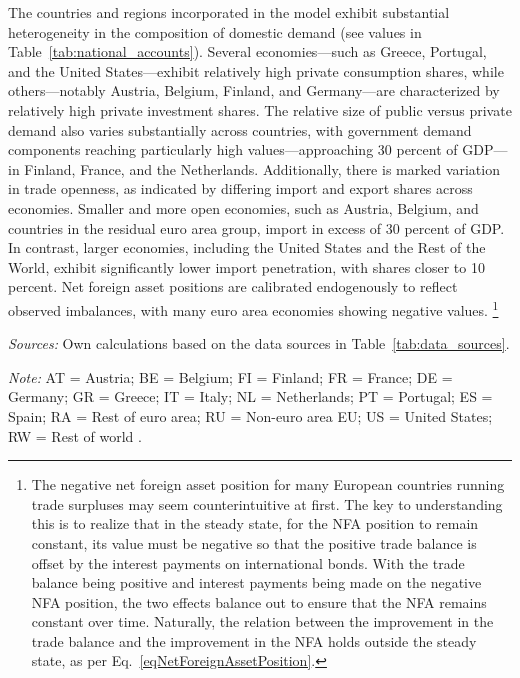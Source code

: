 \documentclass[a4paper,11pt]{article}
\newcommand{\tabnote}[2]{\vspace{2mm}\par\noindent\begin{minipage}{0.9\textwidth}\footnotesize\setlength{\parindent}{0pt}\emph{Sources: }#1\par\vspace{2mm}\emph{Note: }#2\end{minipage}}
\numberwithin{equation}{section}
\newcommand{\CountryCodes}{%
AT = Austria; BE = Belgium; FI = Finland; FR = France; DE = Germany; GR = Greece; IT = Italy; NL = Netherlands; PT = Portugal; ES = Spain; RA = Rest of euro area; RU = Non-euro area EU; US = United States; RW = Rest of world%
}
\begin{document}
The countries and regions incorporated in the model exhibit substantial heterogeneity in the composition of domestic demand (see values in Table~\ref{tab:national_accounts}).
Several economies---such as Greece, Portugal, and the United States---exhibit relatively high private consumption shares, while others---notably Austria, Belgium, Finland, and Germany---are characterized by relatively high private investment shares. The relative size of public versus private demand also varies substantially across countries, with government demand components reaching particularly high values---approaching 30 percent of GDP---in Finland, France, and the Netherlands.
Additionally, there is marked variation in trade openness, as indicated by differing import and export shares across economies.
Smaller and more open economies, such as Austria, Belgium, and countries in the residual euro area group, import in excess of 30 percent of GDP.
In contrast, larger economies, including the United States and the Rest of the World, exhibit significantly lower import penetration, with shares closer to 10 percent.
Net foreign asset positions are calibrated endogenously to reflect observed imbalances, with many euro area economies showing negative values.
\footnote{
    The negative net foreign asset position for many European countries running trade surpluses may seem counterintuitive at first. 
    The key to understanding this is to realize that in the steady state, for the NFA position to remain constant, its value must be negative so that the positive trade balance is offset by the interest payments on international bonds. 
    With the trade balance being positive and interest payments being made on the negative NFA position, the two effects balance out to ensure that the NFA remains constant over time. 
    Naturally, the relation between the improvement in the trade balance and the improvement in the NFA holds outside the steady state, as per Eq.~\ref{eqNetForeignAssetPosition}.
}


\begin{landscape}
    \begin{table}[htbp]
        \centering
        \caption{Steady-State Great Ratios (Percent of GDP) \label{tab:national_accounts}}
        \footnotesize
        \renewcommand{\arraystretch}{1.2}
        
        \tabnote{Own calculations based on the data sources in Table~\ref{tab:data_sources}.}{\CountryCodes.}
    \end{table}
\end{landscape}
\end{document}
